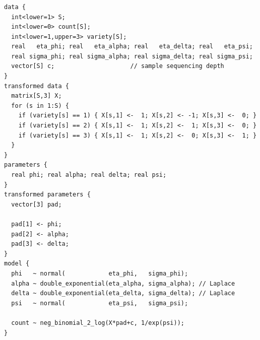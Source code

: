 \documentclass[handout]{beamer}\usepackage[]{graphicx}\usepackage[]{color}
\begin{document}
\begin{frame}[containsverbatim]
\frametitle{}

{\tiny
\begin{verbatim}
data {
  int<lower=1> S;
  int<lower=0> count[S]; 
  int<lower=1,upper=3> variety[S];
  real   eta_phi; real   eta_alpha; real   eta_delta; real   eta_psi; 
  real sigma_phi; real sigma_alpha; real sigma_delta; real sigma_psi;
  vector[S] c;                     // sample sequencing depth
}
transformed data {
  matrix[S,3] X;
  for (s in 1:S) {
    if (variety[s] == 1) { X[s,1] <-  1; X[s,2] <- -1; X[s,3] <-  0; }
    if (variety[s] == 2) { X[s,1] <-  1; X[s,2] <-  1; X[s,3] <-  0; }
    if (variety[s] == 3) { X[s,1] <-  1; X[s,2] <-  0; X[s,3] <-  1; }
  }
}
parameters {
  real phi; real alpha; real delta; real psi;          
}
transformed parameters {
  vector[3] pad;

  pad[1] <- phi;
  pad[2] <- alpha;
  pad[3] <- delta;
}
model {
  phi   ~ normal(            eta_phi,   sigma_phi);
  alpha ~ double_exponential(eta_alpha, sigma_alpha); // Laplace
  delta ~ double_exponential(eta_delta, sigma_delta); // Laplace
  psi   ~ normal(            eta_psi,   sigma_psi);

  count ~ neg_binomial_2_log(X*pad+c, 1/exp(psi));
}
\end{verbatim}
}

\end{frame}
\end{document}
